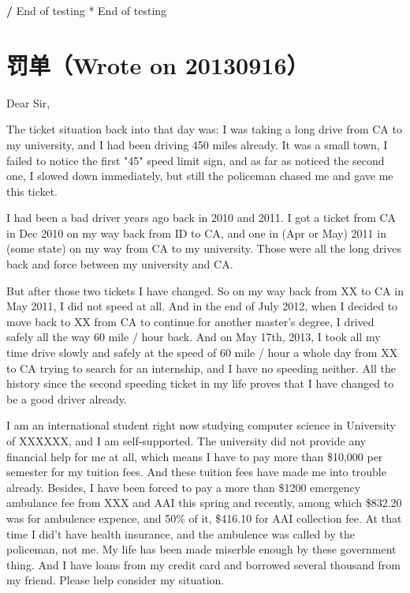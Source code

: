 \documentclass[12pt]{book}
\begin{document}
\textbf{/} End of testing                                                * End of testing

\chapter{罚单（Wrote on 20130916）}
\label{sec-31}

Dear Sir, 

The ticket situation back into that day was: I was taking a long drive from CA to my university, and I had been driving 450 miles already. It was a small town, I failed to notice the first "45" speed limit sign, and as far as noticed the second one, I slowed down immediately, but still the policeman chased me and gave me this ticket. 

I had been a bad driver years ago back in 2010 and 2011. I got a ticket from CA in Dec 2010 on my way back from ID to CA, and one in (Apr or May) 2011 in (some state) on my way from CA to my university. Those were all the long drives back and force between my university and CA. 

But after those two tickets I have changed. So on my way back from XX to CA in May 2011, I did not speed at all. And in the end of July 2012, when I decided to move back to XX from CA to continue for another master's degree, I drived safely all the way 60 mile / hour back. And on May 17th, 2013, I took all my time drive slowly and safely at the speed of 60 mile / hour a whole day from XX to CA trying to search for an internship, and I have no speeding neither. All the history since the second speeding ticket in my life proves that I have changed to be a good driver already.

I am an international student right now studying computer science in University of XXXXXX, and I am self-supported. The university did not provide any financial help for me at all, which means I have to pay more than \$10,000 per semester for my tuition fees. And these tuition fees have made me into trouble already. Besides, I have been forced to pay a more than \$1200 emergency ambulance fee from XXX and AAI this spring and recently, among which \$832.20 was for ambulence expence, and 50\% of it, \$416.10 for AAI collection fee. At that time I did't have health insurance, and the ambulence was called by the policeman, not me. My life has been made miserble enough by these government thing. And I have loans from my credit card and borrowed several thousand from my friend. Please help consider my situation. 
\end{document}
